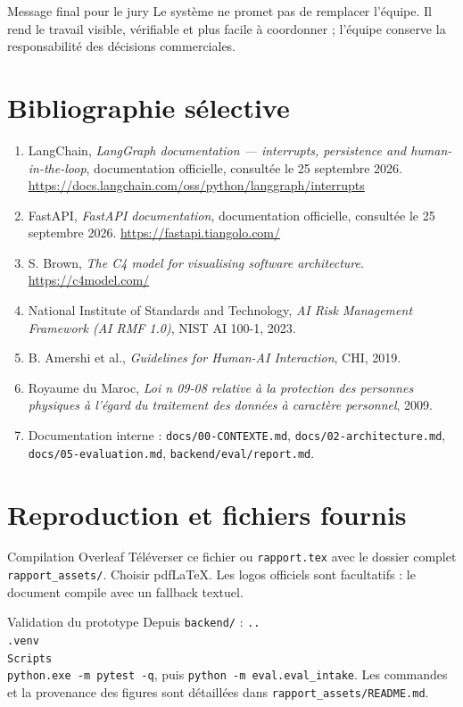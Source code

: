 \documentclass[11pt,a4paper,openany]{report}
\begin{document}
\begin{keybox}{Message final pour le jury}
Le système ne promet pas de remplacer l'équipe. Il rend le travail visible, vérifiable et plus facile à coordonner ; l'équipe conserve la responsabilité des décisions commerciales.
\end{keybox}
\clearpage

\chapter*{Bibliographie sélective}
\begin{enumerate}[leftmargin=1.6em,itemsep=5pt]
\item LangChain, \emph{LangGraph documentation --- interrupts, persistence and human-in-the-loop}, documentation officielle, consultée le 25 septembre 2026. \url{https://docs.langchain.com/oss/python/langgraph/interrupts}
\item FastAPI, \emph{FastAPI documentation}, documentation officielle, consultée le 25 septembre 2026. \url{https://fastapi.tiangolo.com/}
\item S. Brown, \emph{The C4 model for visualising software architecture}. \url{https://c4model.com/}
\item National Institute of Standards and Technology, \emph{AI Risk Management Framework (AI RMF 1.0)}, NIST AI 100-1, 2023.
\item B. Amershi et al., \emph{Guidelines for Human-AI Interaction}, CHI, 2019.
\item Royaume du Maroc, \emph{Loi n\textdegree{} 09-08 relative à la protection des personnes physiques à l'égard du traitement des données à caractère personnel}, 2009.
\item Documentation interne : \texttt{docs/00-CONTEXTE.md}, \texttt{docs/02-architecture.md}, \texttt{docs/05-evaluation.md}, \texttt{backend/eval/report.md}.
\end{enumerate}

\appendix
\chapter{Reproduction et fichiers fournis}
\begin{keybox}{Compilation Overleaf}
Téléverser ce fichier ou \texttt{rapport.tex} avec le dossier complet \texttt{rapport\_assets/}. Choisir pdfLaTeX. Les logos officiels sont facultatifs : le document compile avec un fallback textuel.
\end{keybox}
\begin{keybox}{Validation du prototype}
Depuis \texttt{backend/} : \texttt{..\\.venv\\Scripts\\python.exe -m pytest -q}, puis \texttt{python -m eval.eval\_intake}. Les commandes et la provenance des figures sont détaillées dans \texttt{rapport\_assets/README.md}.
\end{keybox}
\end{document}
